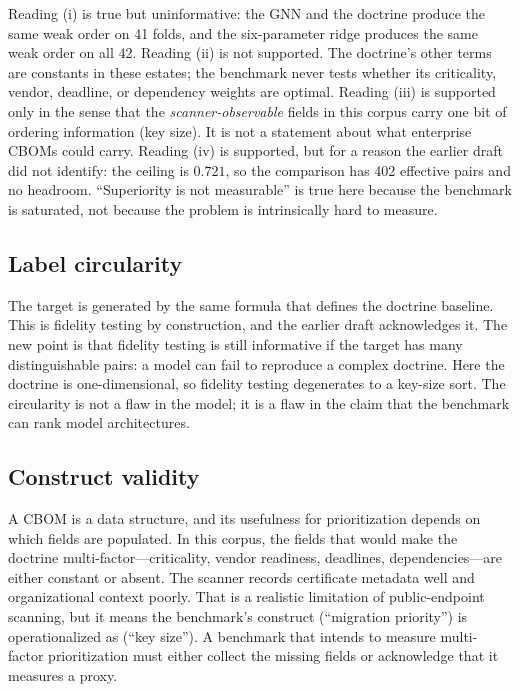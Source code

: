 \documentclass[conference,10pt]{IEEEtran}
\begin{document}
Reading (i) is true but uninformative: the GNN and the doctrine produce the same weak order on
41 folds, and the six-parameter ridge produces the same weak order on all 42. Reading (ii) is
not supported. The doctrine's other terms are constants in these estates; the benchmark never
tests whether its criticality, vendor, deadline, or dependency weights are optimal. Reading (iii)
is supported only in the sense that the \emph{scanner-observable} fields in this corpus carry one
bit of ordering information (key size). It is not a statement about what enterprise CBOMs could
carry. Reading (iv) is supported, but for a reason the earlier draft did not identify: the
ceiling is $0.721$, so the comparison has 402 effective pairs and no headroom. ``Superiority is
not measurable'' is true here because the benchmark is saturated, not because the problem is
intrinsically hard to measure.

\subsection{Label circularity}
The target is generated by the same formula that defines the doctrine baseline. This is fidelity
testing by construction, and the earlier draft acknowledges it. The new point is that fidelity
testing is still informative if the target has many distinguishable pairs: a model can fail to
reproduce a complex doctrine. Here the doctrine is one-dimensional, so fidelity testing
degenerates to a key-size sort. The circularity is not a flaw in the model; it is a flaw in the
claim that the benchmark can rank model architectures.

\subsection{Construct validity}
A CBOM is a data structure, and its usefulness for prioritization depends on which fields are
populated. In this corpus, the fields that would make the doctrine multi-factor---criticality,
vendor readiness, deadlines, dependencies---are either constant or absent. The scanner records
certificate metadata well and organizational context poorly. That is a realistic limitation of
public-endpoint scanning, but it means the benchmark's construct (``migration priority'') is
operationalized as (``key size''). A benchmark that intends to measure multi-factor
prioritization must either collect the missing fields or acknowledge that it measures a proxy.
\end{document}
